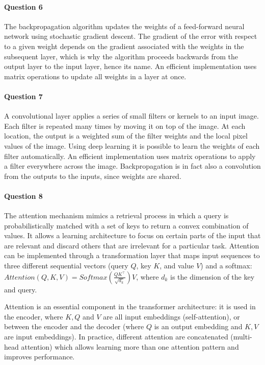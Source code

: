 \documentclass{article}
\begin{document}
\paragraph{Question 6}
The backpropagation algorithm updates the weights of a feed-forward neural network using stochastic gradient descent. The gradient of the error with respect to a given weight depends on the gradient associated with the weights in the subsequent layer, which is why the algorithm proceeds backwards from the output layer to the input layer, hence its name. An efficient implementation uses matrix operations to update all weights in a layer at once.

\paragraph{Question 7}
A convolutional layer applies a series of small filters or kernels to an input image. Each filter is repeated many times by moving it on top of the image. At each location, the output is a weighted sum of the filter weights and the local pixel values of the image. Using deep learning it is possible to learn the weights of each filter automatically. An efficient implementation uses matrix operations to apply a filter everywhere across the image. Backpropagation is in fact also a convolution from the outputs to the inputs, since weights are shared.

\paragraph{Question 8}
The attention mechanism mimics a retrieval process in which a query is probabilistically matched with a
set of keys to return a convex combination of values. It allows a learning architecture to focus on certain parts of
the input that are relevant and discard others that are irrelevant for a particular task.
Attention can be implemented through a transformation layer
that maps input sequences to three different sequential vectors
(query $Q$, key $K$, and value $V$) and a softmax: 
$Attention(Q,K,V)=Softmax\left(\frac{QK^\top}{\sqrt{d_k}}\right)V$, where $d_k$ is
the dimension of the key and query.

Attention is an essential component in the transformer architecture: it is used
in the encoder, where $K,Q$ and $V$ are all input embeddings (self-attention), or between
the encoder and the decoder (where $Q$ is an output embedding and $K,V$ are input embeddings). 
In practice, different attention are concatenated (multi-head attention) which allows learning
more than one attention pattern and improves performance.
\end{document}
